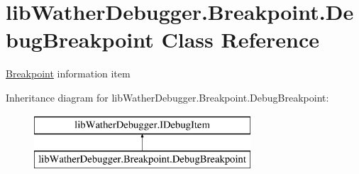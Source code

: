 \hypertarget{classlib_wather_debugger_1_1_breakpoint_1_1_debug_breakpoint}{\section{lib\+Wather\+Debugger.\+Breakpoint.\+Debug\+Breakpoint Class Reference}
\label{classlib_wather_debugger_1_1_breakpoint_1_1_debug_breakpoint}
}


\hyperlink{namespacelib_wather_debugger_1_1_breakpoint}{Breakpoint} information item  


Inheritance diagram for lib\+Wather\+Debugger.\+Breakpoint.\+Debug\+Breakpoint\+:\begin{figure}[H]
\begin{center}
\leavevmode
\includegraphics[height=2.000000cm]{classlib_wather_debugger_1_1_breakpoint_1_1_debug_breakpoint}
\end{center}
\end{figure}
